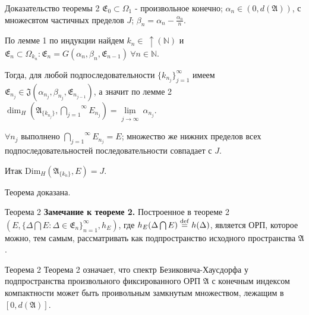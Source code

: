 \documentclass{beamer}
\begin{document}
% 
% 
% 
\begin{frame}{Доказательство теоремы 2}
    $\mathfrak{E}_0 \subset \Omega_1$ - произвольное конечно;
    $\alpha_n \in (0, d( \mathfrak{A} )) $, 
    с множесвтом частичных пределов $J$;
    $\beta_n = \alpha_n - \frac{\alpha_n}{n}$.
    
    По лемме 1 по индукции найдем 
    $k_n \in \  \uparrow(\mathbb{N})$ и
    $\mathfrak{E}_n \subset \Omega_{k_n} : \mathfrak{E}_n =
    G(\alpha_n, \beta_n, \mathfrak{E}_{n-1}) \ \forall n \in \mathbb{N}$.
    
    Тогда, для любой подпоследовательности
    $\{ k_{n_j} \}_{j = 1}^\infty$ имеем
    $\mathfrak{E}_{n_j} \in
    \mathfrak{J} (\alpha_{n_j}, \beta_{n_j}, \mathfrak{E}_{n_{j - 1}})$,
    а значит по лемме 2
    $\dim_H(  \mathfrak{A}_{\{ k_{n_j} \}},
    \overset{\infty}{
        \underset{j = 1}{
            \bigcap
        }
    }
    E_{n_j}
    ) =
    \underset{j \to \infty}{\underline{\lim}} \ \alpha_{n_j}
    $.
    
    $\forall n_j$ выполнено
    $
    \overset{\infty}{
        \underset{j = 1}{
            \bigcap
        }
    }
    E_{n_j} = E
    $;
    множество же нижних пределов всех
    подпоследовательностей последовательности
    совпадает с $J$.

    Итак
    $\mbox{Dim}_H 
    (\mathfrak{A}_{\{ k_{n} \}} , E) =
    J$.
    
    Теорема доказана.
\end{frame}

\begin{frame}{Теорема 2}
    \textbf{Замечание к теореме 2.} Построенное в теореме 2  $(E,
    \{
    \Delta \bigcap E:
    \Delta \in \mathfrak{E}_n
    \}_{n = 1}^\infty 
    ,
    h_E)
    $,
    где $h_E (\Delta \bigcap E)  \mathrel{\stackrel{\rm def}=}
    h(\Delta)$,
    является ОРП,
    которое можно, тем самым, рассматривать как
    подпространство исходного пространства $\mathfrak{A}$.
\end{frame}

\begin{frame}{Теорема 2}
    Теорема 2 означает, что спектр Безиковича-Хаусдорфа у
    подпространства произвольного фиксированного ОРП $\mathfrak{A}$
    с конечным индексом компактности
    может быть проивольным замкнутым множеством,
    лежащим в $[0, d(\mathfrak{A})]$.
\end{frame}
\end{document}
